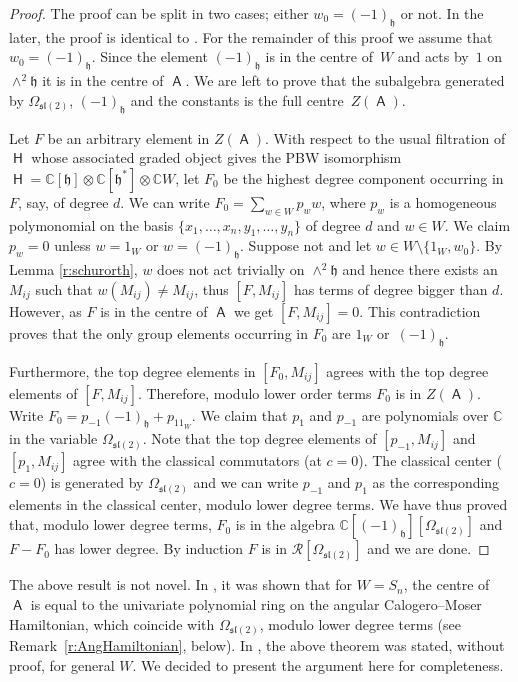 \documentclass[10pt,a4paper]{amsart}
\numberwithin{equation}{section}
\newcommand{\fh}{\mathfrak{h}}
\newcommand{\fl}{\mathfrak{l}}
\newcommand{\fs}{\mathfrak{s}}
\newcommand{\bbc}{\mathbb{C}}
\DeclareMathOperator{\rca}{\mathsf{H}}
\DeclareMathOperator{\ama}{\mathsf{A}}
\begin{document}
\begin{proof}
 The proof can be split in two cases; either $w_0=(-1)_\fh$ or not. In the later, the proof is identical to \cite[Theorem~5]{FH15}. For the remainder of this proof we assume that $w_0=(-1)_\fh$. Since the element $(-1)_\fh$ is in the centre of~$W$ and acts by~$1$ on $\wedge^2 \mathfrak{h}$ it is in the centre of $\ama$. We are left to prove that the subalgebra generated by $\Omega_{\fs\fl(2)}$, $(-1)_\fh$ and the constants is the full centre~$Z(\ama)$.

 Let $F$ be an arbitrary element in $Z(\ama)$. With respect to the usual filtration of $\rca$ whose associated graded object gives the PBW isomorphism $\rca = \bbc[\fh]\otimes\bbc[\fh^*]\otimes\bbc W$, let $F_0$ be the highest degree component occurring in $F$, say, of degree $d$. We can write $F_0 = \sum_{w\in W}p_w w$, where $p_w$ is a homogeneous polymonomial on the basis $\{x_1,\dots,x_n,y_1,\dots,y_n\}$ of degree $d$ and $w\in W$. We claim $p_w=0$ unless $w=1_W$ or $w=(-1)_\fh$. Suppose not and let $w \in W\setminus\{1_W,w_0\}$. By Lemma \ref{r:schurorth}, $w$ does not act trivially on $\wedge^2{\fh}$ and hence there exists an $M_{ij}$ such that $w(M_{ij}) \neq M_{ij}$, thus $[F,M_{ij}]$ has terms of degree bigger than $d$. However, as $F$ is in the centre of $\ama$ we get $[F,M_{ij}]=0$. This contradiction proves that the only group elements occurring in $F_0$ are $1_W$ or~$(-1)_\fh$.

 Furthermore, the top degree elements in $[F_0,M_{ij}]$ agrees with the top degree elements of $[F,M_{ij}]$. Therefore, modulo lower order terms $F_0$ is in $Z(\ama)$. Write $F_0 = p_{-1}(-1)_\fh+ p_11_W$. We claim that $p_{1}$ and $p_{-1}$ are polynomials over $\mathbb{C}$ in the variable $\Omega_{\fs\fl(2)}$. Note that the top degree elements of $[p_{-1},M_{ij}]$ and $[p_{1},M_{ij}]$ agree with the classical commutators (at $c=0$). The classical center ($c=0$) is generated by $\Omega_{\fs\fl(2)}$ and we can write $p_{-1}$ and $p_{1}$ as the corresponding elements in the classical center, modulo lower degree terms. We have thus proved that, modulo lower degree terms, $F_0$ is in the algebra
 $\mathbb{C}[(-1)_\fh][\Omega_{\fs\fl(2)}]$ and $F-F_0$ has lower degree. By induction $F$ is in $\mathcal{R}[\Omega_{\fs\fl(2)}]$ and we are done.
\end{proof}

\begin{Remark}
The above result is not novel. In \cite{FH15}, it was shown that for $W=S_n$, the centre of~$\ama$ is equal to the univariate polynomial ring on the angular Calogero--Moser Hamiltonian, which coincide with $\Omega_{\mathfrak{sl}(2)}$, modulo lower degree terms (see Remark~\ref{r:AngHamiltonian}, below). In \cite[Remark~3.3]{FH19}, the above theorem was stated, without proof, for general $W$. We decided to present the argument here for completeness.
\end{Remark}
\end{document}
